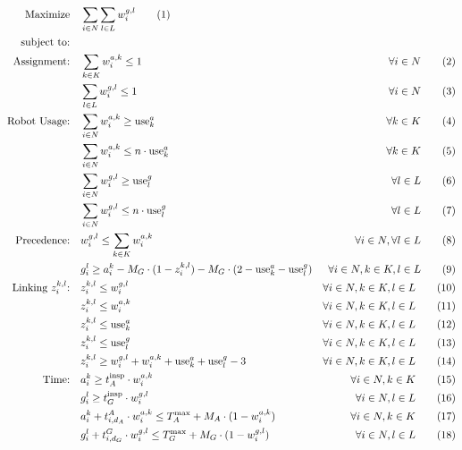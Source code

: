 \documentclass{article}
\begin{document}
		{\small
		\begin{align}
		\text{Maximize} \quad & \sum_{i \in N}\sum_{l \in L} w_i^{g,l} \tag{1} \\
		\text{subject to:} \quad & \notag \\
		\text{Assignment:} \quad & \sum_{k \in K} w_i^{a,k} \leq 1 & \forall i \in N \tag{2} \\
		& \sum_{l \in L} w_i^{g,l} \leq 1 & \forall i \in N \tag{3} \\
		\text{Robot Usage:} \quad & \sum_{i \in N} w_i^{a,k} \geq \text{use}_k^a & \forall k \in K \tag{4} \\
		& \sum_{i \in N} w_i^{a,k} \leq n \cdot \text{use}_k^a & \forall k \in K \tag{5} \\
		& \sum_{i \in N} w_i^{g,l} \geq \text{use}_l^g & \forall l \in L \tag{6} \\
		& \sum_{i \in N} w_i^{g,l} \leq n \cdot \text{use}_l^g & \forall l \in L \tag{7} \\
		\text{Precedence:} \quad & w_i^{g,l} \leq \sum_{k \in K} w_i^{a,k} & \forall i \in N, \forall l \in L \tag{8} \\
		& g_i^l \geq a_i^k - M_G \cdot (1 - z_i^{k,l}) - M_G \cdot (2 - \text{use}_k^a - \text{use}_l^g) & \forall i \in N, k \in K, l \in L \tag{9} \\
		\text{Linking $z_i^{k,l}$:} \quad & z_i^{k,l} \leq w_i^{g,l} & \forall i \in N, k \in K, l \in L \tag{10} \\
		& z_i^{k,l} \leq w_i^{a,k} & \forall i \in N, k \in K, l \in L \tag{11} \\
		& z_i^{k,l} \leq \text{use}_k^a & \forall i \in N, k \in K, l \in L \tag{12} \\
		& z_i^{k,l} \leq \text{use}_l^g & \forall i \in N, k \in K, l \in L \tag{13} \\
		& z_i^{k,l} \geq w_i^{g,l} + w_i^{a,k} + \text{use}_k^a + \text{use}_l^g - 3 & \forall i \in N, k \in K, l \in L \tag{14} \\
		\text{Time:} \quad & a_i^k \geq t_A^{\text{insp}} \cdot w_i^{a,k} & \forall i \in N, k \in K \tag{15} \\
		& g_i^l \geq t_G^{\text{insp}} \cdot w_i^{g,l} & \forall i \in N, l \in L \tag{16} \\
		& a_i^k + t_{i,d_A}^{A} \cdot w_i^{a,k} \leq T_A^{\max} + M_A \cdot (1 - w_i^{a,k}) & \forall i \in N, k \in K \tag{17} \\
		& g_i^l + t_{i,d_G}^{G} \cdot w_i^{g,l} \leq T_G^{\max} + M_G \cdot (1 - w_i^{g,l}) & \forall i \in N, l \in L \tag{18} \\

\end{align}}
\end{document}
